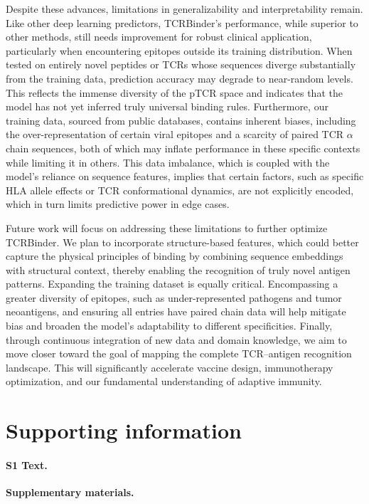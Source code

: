 \documentclass[10pt,letterpaper]{article}
\begin{document}
Despite these advances, limitations in generalizability and interpretability remain. Like other deep learning predictors, TCRBinder’s performance, while superior to other methods, still needs improvement for robust clinical application, particularly when encountering epitopes outside its training distribution. When tested on entirely novel peptides or TCRs whose sequences diverge substantially from the training data, prediction accuracy may degrade to near-random levels. This reflects the immense diversity of the pTCR space and indicates that the model has not yet inferred truly universal binding rules. Furthermore, our training data, sourced from public databases, contains inherent biases, including the over-representation of certain viral epitopes and a scarcity of paired TCR $\alpha$ chain sequences, both of which may inflate performance in these specific contexts while limiting it in others. This data imbalance, which is coupled with the model's reliance on sequence features, implies that certain factors, such as specific HLA allele effects or TCR conformational dynamics, are not explicitly encoded, which in turn limits predictive power in edge cases.


Future work will focus on addressing these limitations to further optimize TCRBinder. We plan to incorporate structure-based features, which could better capture the physical principles of binding by combining sequence embeddings with structural context, thereby enabling the recognition of truly novel antigen patterns. Expanding the training dataset is equally critical. Encompassing a greater diversity of epitopes, such as under-represented pathogens and tumor neoantigens, and ensuring all entries have paired chain data will help mitigate bias and broaden the model's adaptability to different specificities. Finally, through continuous integration of new data and domain knowledge, we aim to move closer toward the goal of mapping the complete TCR–antigen recognition landscape. This will significantly accelerate vaccine design, immunotherapy optimization, and our fundamental understanding of adaptive immunity.

\section*{Supporting information}

\paragraph*{S1 Text.} \label{S1_Text}
\textbf{Supplementary materials.}
\end{document}
